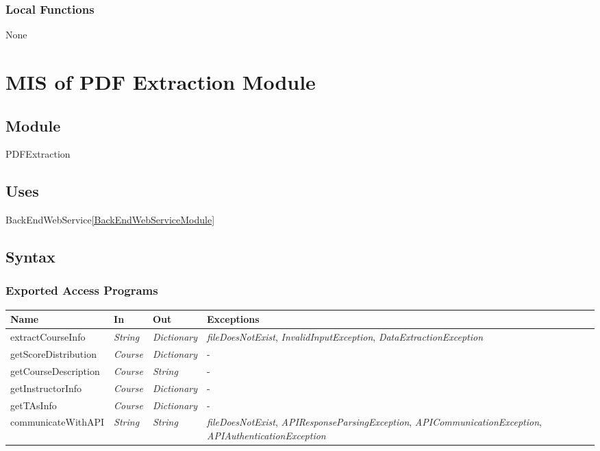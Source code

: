 \documentclass[12pt, titlepage]{article}
\begin{document}
\subsubsection{Local Functions}
None




\newpage
\section{MIS of PDF Extraction Module} \label{PDFExtractionModule}

\subsection{Module}
PDFExtraction

\subsection{Uses}
BackEndWebService\ref{BackEndWebServiceModule}

\subsection{Syntax}

\subsubsection{Exported Access Programs}
\begin{center}
\begin{tabular}{p{4cm} p{3cm} p{3cm} p{3cm}}
\hline
\textbf{Name} & \textbf{In} & \textbf{Out} & \textbf{Exceptions} \\
\hline
extractCourseInfo&  \textit{String} & \textit{Dictionary} & \textit{fileDoesNotExist}, \textit{InvalidInputException}, \textit{DataExtractionException} \\
getScoreDistribution&  \textit{Course} & \textit{Dictionary} & - \\
getCourseDescription&  \textit{Course} & \textit{String} & - \\
getInstructorInfo&  \textit{Course} & \textit{Dictionary} & - \\
getTAsInfo&  \textit{Course} & \textit{Dictionary} & - \\
communicateWithAPI&  \textit{String} & \textit{String} & \textit{fileDoesNotExist}, \textit{APIResponseParsingException}, \textit{APICommunicationException}, \textit{APIAuthenticationException}\\
\hline
\end{tabular}
\end{center}
\end{document}
